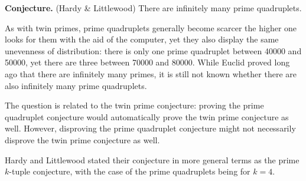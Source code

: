 \documentclass[12pt]{article}
\begin{document}

{\bf Conjecture.} (Hardy \& Littlewood) There are infinitely many prime quadruplets.

As with twin primes, prime quadruplets generally become scarcer the higher one looks for them with the aid of the computer, yet they also display the same unevenness of distribution: there is only one prime quadruplet between 40000 and 50000, yet there are three between 70000 and 80000. While Euclid proved long ago that there are infinitely many primes, it is still not known whether there are also infinitely many prime quadruplets.

The question is related to the twin prime conjecture: proving the prime quadruplet conjecture would automatically prove the twin prime conjecture as well. However, disproving the prime quadruplet conjecture might not necessarily disprove the twin prime conjecture as well.

Hardy and Littlewood stated their conjecture in more general terms as the prime $k$-tuple conjecture, with the case of the prime quadruplets being for $k = 4$.
\end{document}

